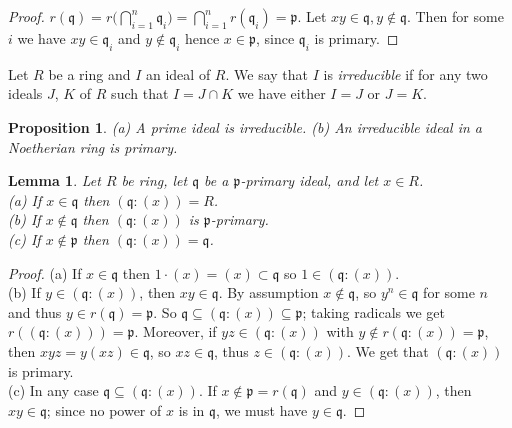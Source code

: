 \documentclass[	DIV=calc,paper=a4,fontsize=11pt]{scrartcl}	 					%
\newtheorem{lem}[thm]{Lemma}
\newtheorem{prop}[thm]{Proposition}
\theoremstyle{definition}
\theoremstyle{plain}
\theoremstyle{remark}
\begin{document}
\begin{proof}
$r(\mathfrak{q}) = r\bigl(\bigcap_{i=1}^n \mathfrak{q}_i\bigl) = \bigcap_{i=1}^n r(\mathfrak{q}_i) = \mathfrak{p}$. Let $xy\in\mathfrak{q},y\notin\mathfrak{q}$. Then for some $i$
we have $xy\in \mathfrak{q}_i$ and $y\notin \mathfrak{q}_i$ hence $x\in \mathfrak{p}$, since $\mathfrak{q}_i$ is primary.
\end{proof}
Let $R$ be a ring and $I$ an ideal of $R$. We say that $I$ is \emph{irreducible} if for any two ideals $J$, $K$ of $R$ such that $I = J\cap K$ we have either $I = J$ or $J = K$.
\begin{prop}\label{prop}
(a) A prime ideal is irreducible. (b) An irreducible ideal in a Noetherian ring is primary.
\end{prop}
\begin{lem}
Let $R$ be ring, let $\mathfrak{q}$ be a $\mathfrak{p}$-primary ideal, and let $x\in R$.\\
(a) If $x\in \mathfrak{q}$ then $(\mathfrak{q} : (x)) = R$.\\
(b) If $x\notin \mathfrak{q}$ then $(\mathfrak{q} : (x))$ is $\mathfrak{p}$-primary.\\
(c) If $x\notin \mathfrak{p}$ then $(\mathfrak{q} : (x)) = \mathfrak{q}$.
\end{lem}
\begin{proof}
(a) If $x\in \mathfrak{q}$ then $1\cdot(x) = (x)\subset \mathfrak{q}$ so $1\in (\mathfrak{q} : (x))$.\\
(b) If $y\in(\mathfrak{q} : (x))$, then $xy\in \mathfrak{q}$. By assumption $x\notin \mathfrak{q}$, so $y^n\in \mathfrak{q}$ for some $n$ and thus $y\in r(\mathfrak{q}) = \mathfrak{p}$. So $\mathfrak{q} \subseteq(\mathfrak{q} : (x)) \subseteq \mathfrak{p}$; taking radicals we get $r((\mathfrak{q} : (x))) = \mathfrak{p}$. Moreover, if $yz\in (\mathfrak{q} : (x))$ with $y\notin r(\mathfrak{q} : (x)) = \mathfrak{p}$, then $xyz = y(xz)\in \mathfrak{q}$, so $xz\in \mathfrak{q}$, thus $z\in (\mathfrak{q} : (x))$. We get that $(\mathfrak{q} : (x))$ is primary.\\
(c) In any case $\mathfrak{q} \subseteq (\mathfrak{q} : (x))$. If $x\notin \mathfrak{p} = r(\mathfrak{q})$ and $y\in (\mathfrak{q} : (x))$, then $xy\in \mathfrak{q}$; since no power of $x$ is in $\mathfrak{q}$, we must have $y\in \mathfrak{q}$.
\end{proof}
\end{document}
